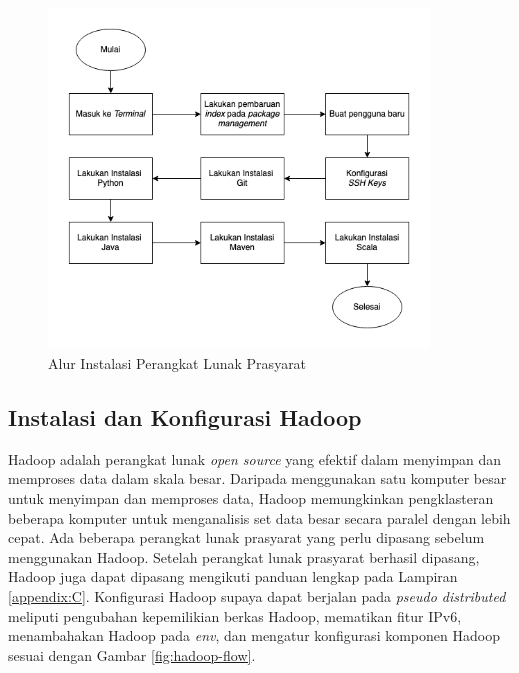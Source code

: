 \begin{figure}[h!]
    \centering
    \includegraphics[width=0.9\textwidth]{figures/ch03/prasayarat-flow.png}
    \caption{Alur Instalasi Perangkat Lunak Prasyarat}
    \label{fig:prasyarat-flow}
\end{figure}

\subsection{Instalasi dan Konfigurasi Hadoop}
Hadoop adalah perangkat lunak \textit{open source} yang efektif dalam menyimpan dan memproses data dalam skala besar. Daripada menggunakan satu komputer besar untuk menyimpan dan memproses data, Hadoop memungkinkan pengklasteran beberapa komputer untuk menganalisis set data besar secara paralel dengan lebih cepat. Ada beberapa perangkat lunak prasyarat yang perlu dipasang sebelum menggunakan Hadoop. Setelah perangkat lunak prasyarat berhasil dipasang, Hadoop juga dapat dipasang mengikuti panduan lengkap pada Lampiran \ref{appendix:C}. Konfigurasi Hadoop supaya dapat berjalan pada \textit{pseudo distributed} meliputi pengubahan kepemilikian berkas Hadoop, mematikan fitur IPv6, menambahakan Hadoop pada \textit{env}, dan mengatur konfigurasi komponen Hadoop sesuai dengan Gambar \ref{fig:hadoop-flow}.

